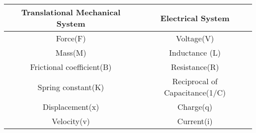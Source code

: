 \begin{tabular}{|c|c|} 
    \hline
\textbf{Translational Mechanical System} & \textbf{Electrical System}  \\\hline
    Force(F) & Voltage(V)  \\\hline
    Mass(M) & Inductance (L) \\\hline
    Frictional coefficient(B) & Resistance(R) \\ \hline
    Spring constant(K) & Reciprocal of Capacitance(1/C)  \\\hline
    Displacement(x) & Charge(q) \\ \hline
    Velocity(v) & Current(i)  \\\hline
        \end{tabular}
    
